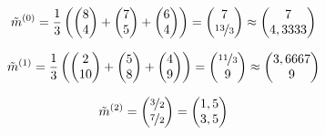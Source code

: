 \documentclass[a4paper,parskip=full-]{article}
\begin{document}
\begin{enumerate}
$$
\tilde{m}^{(0)} = 
\frac{1}{3} \left(
\begin{pmatrix}
8 \\ 4   
\end{pmatrix} +
\begin{pmatrix}
7 \\ 5
\end{pmatrix} +
\begin{pmatrix}
6 \\  4
\end{pmatrix} \right) = 
\begin{pmatrix}
7 \\ \nicefrac{13}{3}
\end{pmatrix} \approx 
\begin{pmatrix}
7 \\ 4,3333
\end{pmatrix}
$$

$$
\tilde{m}^{(1)} = 
\frac{1}{3} \left(
\begin{pmatrix}
2 \\ 10 
\end{pmatrix} +
\begin{pmatrix}
5 \\ 8
\end{pmatrix} +
\begin{pmatrix}
4 \\  9
\end{pmatrix} \right) = 
\begin{pmatrix}
\nicefrac{11}{3} \\ 9
\end{pmatrix} \approx
\begin{pmatrix}
3,6667 \\ 9
\end{pmatrix}
$$

$$
\tilde{m}^{(2)} = 
\begin{pmatrix}
\nicefrac{3}{2} \\ \nicefrac{7}{2}
\end{pmatrix} =
\begin{pmatrix}
1,5 \\ 3,5
\end{pmatrix}
$$
\end{enumerate}
\end{document}
